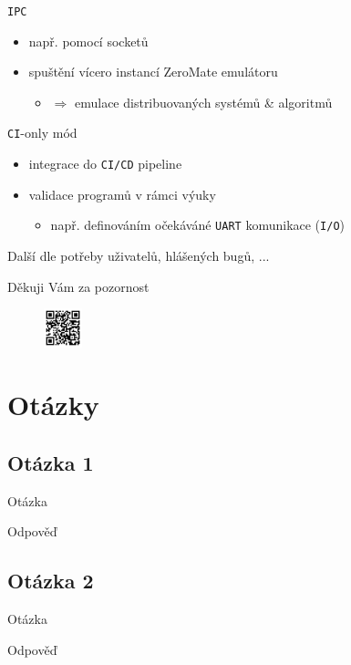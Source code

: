 \documentclass[compress]{beamer}
\begin{document}
\begin{frame}
	\begin{block}{\texttt{IPC}}
		\begin{itemize}
			\item např. pomocí socketů
			\item spuštění vícero instancí ZeroMate emulátoru
			\begin{itemize}
				\item $\Rightarrow$ emulace distribuovaných systémů \& algoritmů
			\end{itemize}
		\end{itemize}
	\end{block}
	\begin{block}{\texttt{CI}-only mód}
		\begin{itemize}
			\item integrace do \texttt{CI/CD} pipeline
			\item validace programů v rámci výuky
			\begin{itemize}
				\item např. definováním očekáváné \texttt{UART} komunikace (\texttt{I/O})
			\end{itemize}
		\end{itemize}
	\end{block}
	\noindent\makebox[\linewidth]{\rule{\textwidth}{0.4pt}}
	Další dle potřeby uživatelů, hlášených bugů, ...
\end{frame}

\begin{frame}
  \centering \Large
  Děkuji Vám za pozornost\\
  \href{https://github.com/silhavyj/ZeroMate}{}
  \begin{figure}
  	\centering
  	\includegraphics[width=0.10\textwidth]{img/qr-code.pdf}
  \end{figure}
\end{frame}

\appendix

\section{Otázky}

\subsection{Otázka 1}

\begin{frame}
	\begin{block}{Otázka}
	\end{block}
	\begin{block}{Odpověď}
	\end{block}
\end{frame}

\subsection{Otázka 2}

\begin{frame}
	\begin{block}{Otázka}
	\end{block}
	\begin{block}{Odpověď}
	\end{block}
\end{frame}
\end{document}
